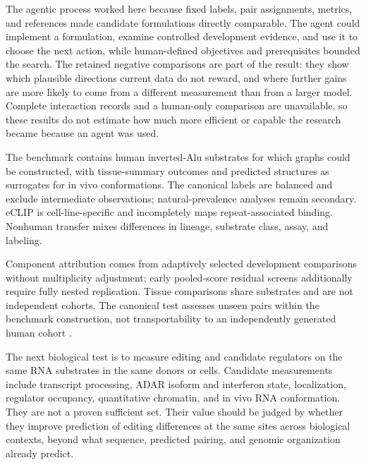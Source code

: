 \documentclass[9pt,twocolumn,twoside]{pnas-new}
\begin{document}
The agentic process worked here because fixed labels, pair assignments, metrics, and references made candidate formulations directly comparable. The agent could implement a formulation, examine controlled development evidence, and use it to choose the next action, while human-defined objectives and prerequisites bounded the search. The retained negative comparisons are part of the result: they show which plausible directions current data do not reward, and where further gains are more likely to come from a different measurement than from a larger model. Complete interaction records and a human-only comparison are unavailable, so these results do not estimate how much more efficient or capable the research became because an agent was used.

The benchmark contains human inverted-Alu substrates for which graphs could be constructed, with tissue-summary outcomes and predicted structures as surrogates for in vivo conformations. The canonical labels are balanced and exclude intermediate observations; natural-prevalence analyses remain secondary. eCLIP is cell-line-specific and incompletely maps repeat-associated binding. Nonhuman transfer mixes differences in lineage, substrate class, assay, and labeling.

Component attribution comes from adaptively selected development comparisons without multiplicity adjustment; early pooled-score residual screens additionally require fully nested replication. Tissue comparisons share substrates and are not independent cohorts. The canonical test assesses unseen pairs within the benchmark construction, not transportability to an independently generated human cohort \cite{Rosenwasser2026AdarEdit}.

The next biological test is to measure editing and candidate regulators on the same RNA substrates in the same donors or cells. Candidate measurements include transcript processing, ADAR isoform and interferon state, localization, regulator occupancy, quantitative chromatin, and in vivo RNA conformation. They are not a proven sufficient set. Their value should be judged by whether they improve prediction of editing differences at the same sites across biological contexts, beyond what sequence, predicted pairing, and genomic organization already predict.
\end{document}
